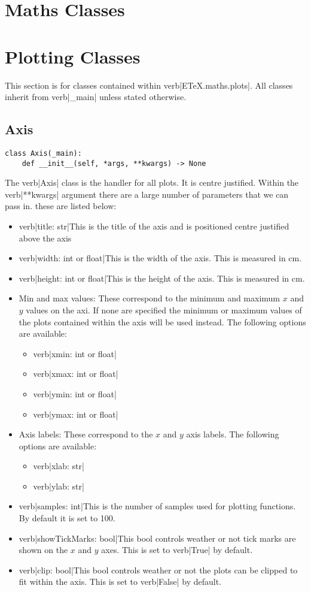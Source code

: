 \documentclass{article}
\begin{document}
\section{Maths Classes}\label{sec:maths_classes}

\section{Plotting Classes}\label{sec:plotting_classes}
This section is for classes contained within verb|ETeX.maths.plots|. All classes inherit from verb|_main| unless stated otherwise.
\subsection{Axis}\label{subsec:axis}
\begin{verbatim}
class Axis(_main):
	def __init__(self, *args, **kwargs) -> None
\end{verbatim}
The verb|Axis| class is the handler for all plots. It is centre justified. Within the verb|**kwargs| argument there are a large number of parameters that we can pass in. these are listed below:\begin{itemize}
\item verb|title: str|This is the title of the axis and is positioned centre justified above the axis
\item verb|width: int or float|This is the width of the axis. This is measured in cm.
\item verb|height: int or float|This is the height of the axis. This is measured in cm.
\item Min and max values:
These correspond to the minimum and maximum $x$ and $y$ values on the axi. If none are specified the minimum or maximum values of the plots contained within the axis will be used instead. The following options are available:\begin{itemize}
\item verb|xmin: int or float|
\item verb|xmax: int or float|
\item verb|ymin: int or float|
\item verb|ymax: int or float|
\end{itemize}

\item Axis labels:
These correspond to the $x$ and $y$ axis labels. The following options are available:\begin{itemize}
\item verb|xlab: str|
\item verb|ylab: str|
\end{itemize}

\item verb|samples: int|This is the number of samples used for plotting functions. By default it is set to 100.
\item verb|showTickMarks: bool|This bool controls weather or not tick marks are shown on the $x$ and $y$ axes. This is set to verb|True| by default.
\item verb|clip: bool|This bool controls weather or not the plots can be clipped to fit within the axis. This is set to verb|False| by default.
\end{itemize}
\end{document}
